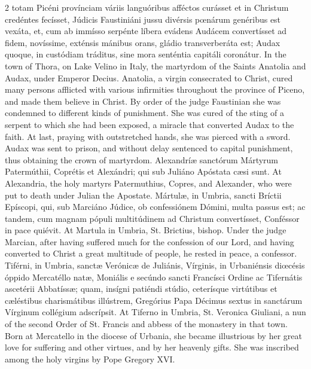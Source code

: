 \begin{paracol}{2}
 totam Picéni provínciam váriis languóribus afféctos curásset et in Christum 
 credéntes fecísset, Júdicis Faustiniáni jussu divérsis pœnárum genéribus est 
 vexáta, et, cum ab immísso serpénte líbera evádens Audácem convertísset ad 
 fidem, novíssime, exténsis mánibus orans, gládio transverberáta est; Audax 
 quoque, in custódiam tráditus, sine mora senténtia capitáli coronátur.
\switchcolumn
{}
In the town of Thora, on Lake Velino 
 in Italy, the martyrdom of the Saints Anatolia and Audax, under Emperor 
 Decius. Anatolia, a virgin consecrated to Christ, cured many persons 
 afflicted with various infirmities throughout the province of Piceno, and 
 made them believe in Christ. By order of the judge Faustinian she was 
 condemned to different kinds of punishment. She was cured of the sting 
 of a serpent to which she had been exposed, a miracle that converted Audax 
 to the faith. At last, praying with outstretched hands, she was 
 pierced with a sword. Audax was sent to prison, and without delay 
 sentenced to capital punishment, thus obtaining the crown of martyrdom.
\switchcolumn*
{}
Alexandríæ sanctórum 
 Mártyrum Patermúthii, Coprétis et Alexándri; qui sub Juliáno Apóstata cæsi 
 sunt.
\switchcolumn
{}
At Alexandria, the holy martyrs 
 Patermuthius, Copres, and Alexander, who were put to death under Julian the 
 Apostate.
\switchcolumn*
{}
Mártulæ, in Umbria, 
 sancti Bríctii Epíscopi, qui, sub Marciáno Júdice, ob confessiónem Dómini, 
 multa passus est; ac tandem, cum magnam pópuli multitúdinem ad Christum 
 convertísset, Conféssor in pace quiévit.
\switchcolumn
{}
At Martula in Umbria, St. Brictius, 
 bishop. Under the judge Marcian, after having suffered much for the 
 confession of our Lord, and having converted to Christ a great multitude of 
 people, he rested in peace, a confessor.
\switchcolumn*
{}
Tiférni, in Umbria, 
 sanctæ Verónicæ de Juliánis, Vírginis, in Urbaniénsis diœcésis óppido 
 Mercatéllo natæ, Moniális e secúndo sancti Francísci Ordine ac Tifernátis 
 ascetérii Abbatíssæ; quam, insígni patiéndi stúdio, ceterísque virtútibus et 
 cæléstibus charismátibus illústrem, Gregórius Papa Décimus sextus in 
 sanctárum Vírginum collégium adscrípsit.
\switchcolumn
{}
At Tiferno in Umbria, St. Veronica 
 Giuliani, a nun of the second Order of St. Francis and abbess of the 
 monastery in that town. Born at Mercatello in the diocese of Urbania, 
 she became illustrious by her great love for suffering and other virtues, 
 and by her heavenly gifts. She was inscribed among the holy virgins by 
 Pope Gregory XVI.
\switchcolumn*
{}
\end{paracol}


